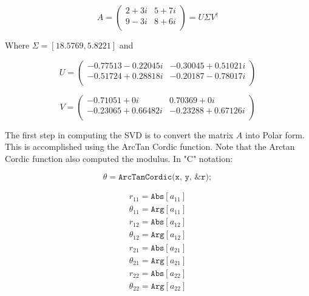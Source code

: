 \begin{equation}\label{test}
    A= \left(
         \begin{array}{cc}
           2+3i & 5+7i \\
           9-3i & 8+6i \\
         \end{array}
       \right)
    =U \Sigma V^\dag
\end{equation}

Where $\Sigma = [ 18.5769, 5.8221 ] $ and

\begin{equation}\label{test}
U=\left(
    \begin{array}{cc}
      -0.77513-0.22045i & -0.30045+0.51021i \\
      -0.51724+0.28818i & -0.20187-0.78017i \\
    \end{array}
  \right)
\end{equation}


\begin{equation}\label{test}
V=\left(
    \begin{array}{cc}
      -0.71051+0i & 0.70369+0i \\
      -0.23065+0.66482i & -0.23288+0.67126i \\
    \end{array}
  \right)
\end{equation}

The first step in computing the SVD is to convert the matrix $A$ into Polar form. This is accomplished using the ArcTan Cordic function. Note that the Arctan Cordic function  also computed the modulus. In "C" notation:

\begin{equation}\label{test}
  \theta=\texttt{ArcTanCordic(x, y, \&r)};
\end{equation}

\begin{equation}\label{test}
\begin{array}{c}
  r_{11}=\texttt{Abs}[a_{11}] \\
  \theta _{11}=\texttt{Arg}[a_{11}] \\
  r_{12}=\texttt{Abs}[a_{12}] \\
  \theta_{12}=\texttt{Arg}[a_{12}] \\
  r_{21}=\texttt{Abs}[a_{21}] \\
  \theta_{21}=\texttt{Arg}[a_{21}] \\
  r_{22}=\texttt{Abs}[a_{22}] \\
  \theta_{22}=\texttt{Arg}[a_{22}]
\end{array}
\end{equation}

